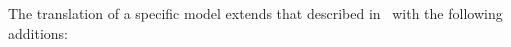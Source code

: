 

The translation of a specific \SCXML model extends that described in~\cite{MoSn16,MoSnHo18} with the following additions:



